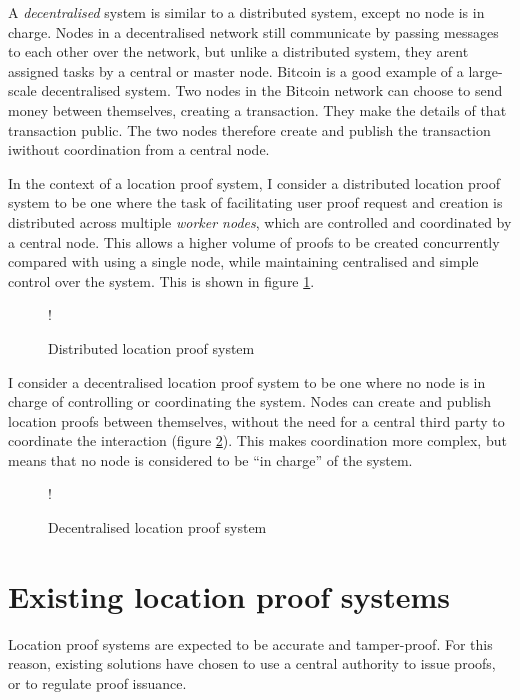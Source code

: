 A \textit{decentralised} system is similar to a distributed system, except no node is in charge. Nodes in a decentralised network still communicate by passing messages to each other over the network, but unlike a distributed system, they arent assigned tasks by a central or master node. Bitcoin \cite{bitcoin} is a good example of a large-scale decentralised system. Two nodes in the Bitcoin network can choose to send money between themselves, creating a transaction. They make the details of that transaction public. The two nodes therefore create and publish the transaction iwithout coordination from a central node.

In the context of a location proof system, I consider a distributed location proof system to be one where the task of facilitating user proof request and creation is distributed across multiple \textit{worker nodes}, which are controlled and coordinated by a central node. This allows a higher volume of proofs to be created concurrently compared with using a single node, while maintaining centralised and simple control over the system. This is shown in figure \ref{fig:distributed_location}.

\begin{figure}[H]
\begin{center}
 {!} {}
\end{center}
\caption{Distributed location proof system}
\label{fig:distributed_location}
\end{figure}

I consider a decentralised location proof system to be one where no node is in charge of controlling or coordinating the system. Nodes can create and publish location proofs between themselves, without the need for a central third party to coordinate the interaction (figure \ref{fig:decentralised_location}). This makes coordination more complex, but means that no node is considered to be ``in charge'' of the system.

\begin{figure}[H]
\begin{center}
 {!} {}
\end{center}
\caption{Decentralised location proof system}
\label{fig:decentralised_location}
\end{figure}

\section{Existing location proof systems} \label{ssec:proof_systems}
Location proof systems are expected to be accurate and tamper-proof. For this reason, existing solutions \cite{brassil, luo, khan} have chosen to use a central authority to issue proofs, or to regulate proof issuance.

